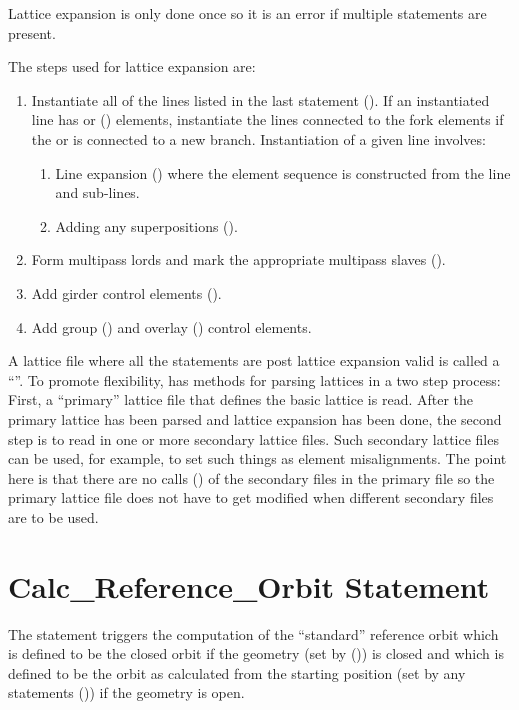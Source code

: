 {{{{{Lattice expansion is only done once so it is an error if multiple
 statements are present.

The steps used for lattice expansion are:
\begin{enumerate}
\item
Instantiate all of the lines listed in the last  statement (). If an instantiated line has
 or  () elements, instantiate the lines connected to the fork
elements if the  or  is connected to a new branch. Instantiation of a given
line involves:
\begin{enumerate}
\item
Line expansion () where the element sequence is constructed from the line and sub-lines.
\item
Adding any superpositions ().
\end{enumerate}
\item
Form multipass lords and mark the appropriate multipass slaves ().
\item
Add girder control elements ().
\item
Add group () and overlay () control elements.
\end{enumerate}

A lattice file where all the statements are post lattice expansion valid is called a ``''.  To promote flexibility, \bmad has methods for parsing lattices in a two step
process: First, a ``primary'' lattice file that defines the basic lattice is read. After the primary
lattice has been parsed and lattice expansion has been done, the second step is to read in one or
more secondary lattice files. Such secondary lattice files can be used, for example, to set such
things as element misalignments. The point here is that there are no calls () of the
secondary files in the primary file so the primary lattice file does not have to get modified when
different secondary files are to be used.

\section{Calc_Reference_Orbit Statement}
\label{s:calc.ref.orbit}

The  statement triggers the computation of the ``standard'' reference orbit
which is defined to be the closed orbit if the geometry (set by 
()) is closed and which is defined to be the orbit as calculated from the starting
position (set by any  statements ()) if the geometry is open.

}}}}}
